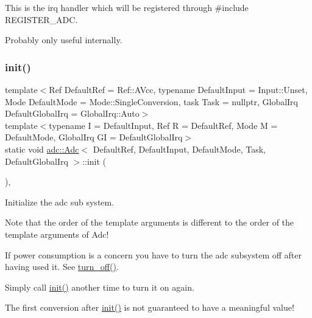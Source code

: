 This is the irq handler which will be registered through {\ttfamily \#include R\+E\+G\+I\+S\+T\+E\+R\+\_\+\+A\+DC}. 

Probably only useful internally. \hypertarget{classadc_1_1Adc_a146fe898e16915e9b344019c59cdcfa3}{}\label{classadc_1_1Adc_a146fe898e16915e9b344019c59cdcfa3} 
\subsubsection{\texorpdfstring{init()}{init()}}
{\footnotesize\ttfamily template$<$Ref Default\+Ref = Ref\+::\+A\+Vcc, typename Default\+Input  = Input\+::\+Unset, Mode Default\+Mode = Mode\+::\+Single\+Conversion, task Task = nullptr, Global\+Irq Default\+Global\+Irq = Global\+Irq\+::\+Auto$>$ \\
template$<$typename I  = Default\+Input, Ref R = Default\+Ref, Mode M = Default\+Mode, Global\+Irq GI = Default\+Global\+Irq$>$ \\
static void \hyperlink{classadc_1_1Adc}{adc\+::\+Adc}$<$ Default\+Ref, Default\+Input, Default\+Mode, Task, Default\+Global\+Irq $>$\+::init (\begin{DoxyParamCaption}{ }\end{DoxyParamCaption})\hspace{0.3cm}{\ttfamily [inline]}, {\ttfamily [static]}}



Initialize the adc sub system. 

Note that the order of the template arguments is different to the order of the template arguments of Adc!

If power consumption is a concern you have to turn the adc subsystem off after having used it. See \hyperlink{classadc_1_1Adc_a0c1266c2f27fefea08595aaf26762f26}{turn\+\_\+off()}.

Simply call \hyperlink{classadc_1_1Adc_a146fe898e16915e9b344019c59cdcfa3}{init()} another time to turn it on again.

The first conversion after \hyperlink{classadc_1_1Adc_a146fe898e16915e9b344019c59cdcfa3}{init()} is not guaranteed to have a meaningful value!


